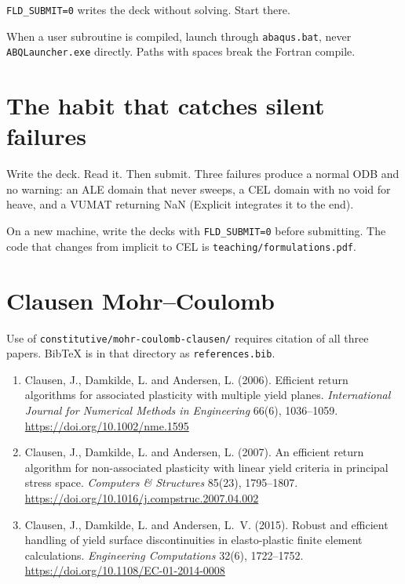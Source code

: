 \documentclass[11pt,a4paper]{article}
\begin{document}
\texttt{FLD\_SUBMIT=0} writes the deck without solving. Start there.

When a user subroutine is compiled, launch through \texttt{abaqus.bat}, never
\texttt{ABQLauncher.exe} directly. Paths with spaces break the Fortran compile.

\section{The habit that catches silent failures}

Write the deck. Read it. Then submit. Three failures produce a normal ODB and
no warning: an ALE domain that never sweeps, a CEL domain with no void for
heave, and a VUMAT returning NaN (Explicit integrates it to the end).

On a new machine, write the decks with \texttt{FLD\_SUBMIT=0} before
submitting. The code that changes from implicit to CEL is
\texttt{teaching/formulations.pdf}.

\section{Clausen Mohr--Coulomb}

Use of \texttt{constitutive/mohr-coulomb-clausen/} requires citation of all
three papers. BibTeX is in that directory as \texttt{references.bib}.

\begin{enumerate}
  \item Clausen, J., Damkilde, L. and Andersen, L. (2006). Efficient return
        algorithms for associated plasticity with multiple yield planes.
        \emph{International Journal for Numerical Methods in Engineering}
        66(6), 1036--1059. \url{https://doi.org/10.1002/nme.1595}
  \item Clausen, J., Damkilde, L. and Andersen, L. (2007). An efficient return
        algorithm for non-associated plasticity with linear yield criteria in
        principal stress space. \emph{Computers \& Structures} 85(23),
        1795--1807. \url{https://doi.org/10.1016/j.compstruc.2007.04.002}
  \item Clausen, J., Damkilde, L. and Andersen, L.~V. (2015). Robust and
        efficient handling of yield surface discontinuities in elasto-plastic
        finite element calculations. \emph{Engineering Computations} 32(6),
        1722--1752. \url{https://doi.org/10.1108/EC-01-2014-0008}
\end{enumerate}
\end{document}
